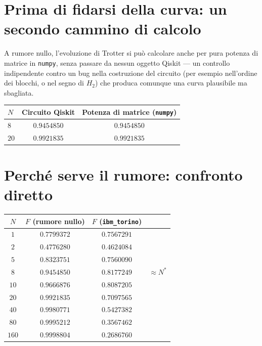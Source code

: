 \documentclass[11pt,a4paper]{article}
\begin{document}
\section{Prima di fidarsi della curva: un secondo cammino di calcolo}

A rumore nullo, l'evoluzione di Trotter si può calcolare anche per pura
potenza di matrice in \texttt{numpy}, senza passare da nessun oggetto
Qiskit --- un controllo indipendente contro un bug nella costruzione del
circuito (per esempio nell'ordine dei blocchi, o nel segno di $H_2$) che
produca comunque una curva plausibile ma sbagliata.

\begin{center}
\renewcommand{\arraystretch}{1.25}
\begin{tabular}{@{}lcc@{}}
\toprule
$N$ & Circuito Qiskit & Potenza di matrice (\texttt{numpy})\\
\midrule
$8$ & $0.9454850$ & $0.9454850$\\
$20$ & $0.9921835$ & $0.9921835$\\
\bottomrule
\end{tabular}
\end{center}


\section{Perché serve il rumore: confronto diretto}

\begin{center}
\renewcommand{\arraystretch}{1.15}
\small
\begin{tabular}{@{}cccc@{}}
\toprule
$N$ & $F$ (rumore nullo) & $F$ (\texttt{ibm\_torino}) & \\
\midrule
$1$ & $0.7799372$ & $0.7567291$ & \\
$2$ & $0.4776280$ & $0.4624084$ & \\
$5$ & $0.8323751$ & $0.7560090$ & \\
$8$ & $0.9454850$ & $0.8177249$ & $\approx N^*$\\
$10$ & $0.9666876$ & $0.8087205$ & \\
$20$ & $0.9921835$ & $0.7097565$ & \\
$40$ & $0.9980771$ & $0.5427382$ & \\
$80$ & $0.9995212$ & $0.3567462$ & \\
$160$ & $0.9998804$ & $0.2686760$ & \\
\bottomrule
\end{tabular}
\end{center}
\end{document}
